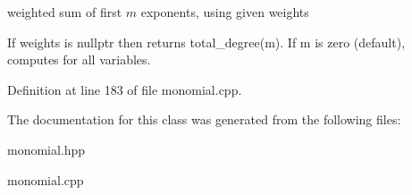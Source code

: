 weighted sum of first $m$ exponents, using given weights 

If {\ttfamily weights} is {\ttfamily nullptr} then returns total\+\_\+degree(m). If {\ttfamily m} is zero (default), computes for all variables. 

Definition at line 183 of file monomial.\+cpp.



The documentation for this class was generated from the following files\+:\begin{DoxyCompactItemize}
\item 
monomial.\+hpp\item 
monomial.\+cpp\end{DoxyCompactItemize}
